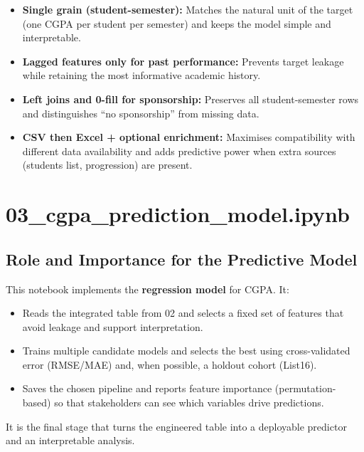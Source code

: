 \documentclass[12pt,a4paper]{article}
\begin{document}
\begin{itemize}[leftmargin=*]
  \item \textbf{Single grain (student-semester):} Matches the natural unit of the target (one CGPA per student per semester) and keeps the model simple and interpretable.
  \item \textbf{Lagged features only for past performance:} Prevents target leakage while retaining the most informative academic history.
  \item \textbf{Left joins and 0-fill for sponsorship:} Preserves all student-semester rows and distinguishes ``no sponsorship'' from missing data.
  \item \textbf{CSV then Excel + optional enrichment:} Maximises compatibility with different data availability and adds predictive power when extra sources (students list, progression) are present.
\end{itemize}

\section{03\_cgpa\_prediction\_model.ipynb}

\subsection{Role and Importance for the Predictive Model}

This notebook implements the \textbf{regression model} for CGPA. It:

\begin{itemize}[leftmargin=*]
  \item Reads the integrated table from 02 and selects a fixed set of features that avoid leakage and support interpretation.
  \item Trains multiple candidate models and selects the best using cross-validated error (RMSE/MAE) and, when possible, a holdout cohort (List16).
  \item Saves the chosen pipeline and reports feature importance (permutation-based) so that stakeholders can see which variables drive predictions.
\end{itemize}

It is the final stage that turns the engineered table into a deployable predictor and an interpretable analysis.
\end{document}
